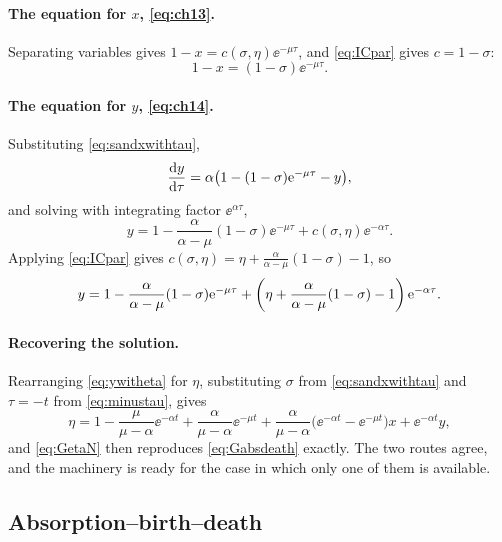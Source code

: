 \paragraph{The equation for $x$, \eqref{eq:ch13}.}
Separating variables gives $1-x = c(\sigma,\eta)\ee^{-\mu\tau}$, and
\cref{eq:ICpar} gives $c = 1-\sigma$:
\begin{equation}
\label{eq:sandxwithtau}
1-x = (1-\sigma)\ee^{-\mu\tau} .
\end{equation}

\paragraph{The equation for $y$, \eqref{eq:ch14}.}
Substituting \cref{eq:sandxwithtau},
\begin{equation*}
\frac{\mathrm{d} y}{\mathrm{d} \tau} = \alpha\bigl(1-(1-\sigma)\mathrm{e}^{-\mu\tau}-y\bigr),
\end{equation*}
and solving with integrating factor $\ee^{\alpha\tau}$,
\begin{equation*}
y = 1-\frac{\alpha}{\alpha-\mu}(1-\sigma)\ee^{-\mu\tau} + c(\sigma,\eta)\ee^{-\alpha\tau} .
\end{equation*}
Applying \cref{eq:ICpar} gives
$c(\sigma,\eta) = \eta + \frac{\alpha}{\alpha-\mu}(1-\sigma)-1$, so
\begin{equation}
\label{eq:ywitheta}
y = 1-\frac{\alpha}{\alpha-\mu}(1-\sigma)\mathrm{e}^{-\mu\tau}
+ \left(\eta + \frac{\alpha}{\alpha-\mu}(1-\sigma)-1\right)\mathrm{e}^{-\alpha\tau} .
\end{equation}

\paragraph{Recovering the solution.}
Rearranging \cref{eq:ywitheta} for $\eta$, substituting $\sigma$ from
\cref{eq:sandxwithtau} and $\tau=-t$ from \cref{eq:minustau}, gives
\begin{equation*}
\eta = 1-\frac{\mu}{\mu-\alpha}\ee^{-\alpha t} + \frac{\alpha}{\mu-\alpha}\ee^{-\mu t}
+ \frac{\alpha}{\mu-\alpha}\bigl(\ee^{-\alpha t}-\ee^{-\mu t}\bigr)x
+ \ee^{-\alpha t}y ,
\end{equation*}
and \cref{eq:GetaN} then reproduces \cref{eq:Gabsdeath} exactly. The two routes
agree, and the machinery is ready for the case in which only one of them is
available.

\subsection{Absorption--birth--death}
\label{sec:absbirthdeath}

